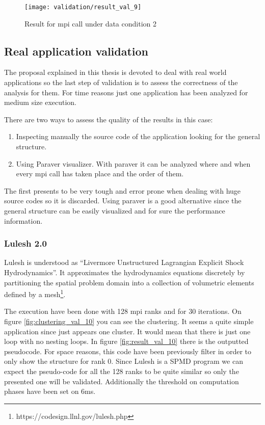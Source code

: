 \begin{figure}[H]
    \centering
    \texttt{[image: validation/result\_val\_9]}
    \caption{Result for mpi call under data condition 2}
    \label{fig:result_val_9}
\end{figure}

\subsection{Real application validation}

The proposal explained in this thesis is devoted to deal with real world
applications so the last step of validation is to assess the correctness of the
analysis for them. For time reasons just one application has been analyzed
for medium size execution.

There are two ways to assess the quality of the results in this case:
\begin{enumerate}[label=\roman*)]
  \item Inspecting manually the source code of the application looking for the
    general structure. 
  \item Using Paraver visualizer. With paraver it can be analyzed where and when
    every mpi call has taken place and the order of them. 
\end{enumerate}

The first presents to be very tough and error prone when dealing with
huge source codes so it is discarded. Using paraver is a good alternative since
the general structure can be easily visualized and for sure the performance
information. 

\subsubsection{Lulesh 2.0}

Lulesh is understood as ``Livermore Unstructured Lagrangian Explicit
Shock Hydrodynamics''. It approximates the hydrodynamics equations discretely 
by partitioning the spatial problem domain into a collection of volumetric 
elements defined by a mesh\footnote{https://codesign.llnl.gov/lulesh.php}.

The execution have been done with 128 mpi ranks and for 30 iterations. On figure
\ref{fig:clustering_val_10} you can see the clustering. It seems a quite simple
application since just appears one cluster. It would mean that there is just one
loop with no nesting loops. 
In figure \ref{fig:result_val_10} there is the outputted pseudocode.
For space reasons, this code have been previously filter in order to only show
the structure for rank 0. Since Lulesh is a SPMD program we can expect the
pseudo-code for all the 128 ranks to be quite similar so only the presented one
will be validated. Additionally the threshold on computation phases have been
set on 6ms.

